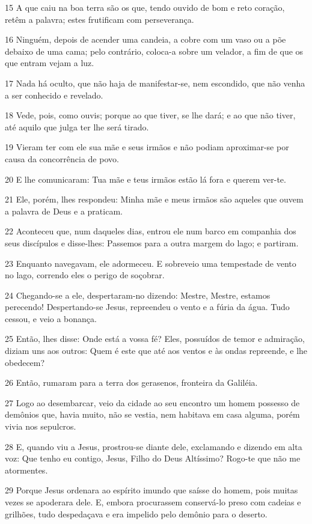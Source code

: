 \par 15 A que caiu na boa terra são os que, tendo ouvido de bom e reto coração, retêm a palavra; estes frutificam com perseverança.
\par 16 Ninguém, depois de acender uma candeia, a cobre com um vaso ou a põe debaixo de uma cama; pelo contrário, coloca-a sobre um velador, a fim de que os que entram vejam a luz.
\par 17 Nada há oculto, que não haja de manifestar-se, nem escondido, que não venha a ser conhecido e revelado.
\par 18 Vede, pois, como ouvis; porque ao que tiver, se lhe dará; e ao que não tiver, até aquilo que julga ter lhe será tirado.
\par 19 Vieram ter com ele sua mãe e seus irmãos e não podiam aproximar-se por causa da concorrência de povo.
\par 20 E lhe comunicaram: Tua mãe e teus irmãos estão lá fora e querem ver-te.
\par 21 Ele, porém, lhes respondeu: Minha mãe e meus irmãos são aqueles que ouvem a palavra de Deus e a praticam.
\par 22 Aconteceu que, num daqueles dias, entrou ele num barco em companhia dos seus discípulos e disse-lhes: Passemos para a outra margem do lago; e partiram.
\par 23 Enquanto navegavam, ele adormeceu. E sobreveio uma tempestade de vento no lago, correndo eles o perigo de soçobrar.
\par 24 Chegando-se a ele, despertaram-no dizendo: Mestre, Mestre, estamos perecendo! Despertando-se Jesus, repreendeu o vento e a fúria da água. Tudo cessou, e veio a bonança.
\par 25 Então, lhes disse: Onde está a vossa fé? Eles, possuídos de temor e admiração, diziam uns aos outros: Quem é este que até aos ventos e às ondas repreende, e lhe obedecem?
\par 26 Então, rumaram para a terra dos gerasenos, fronteira da Galiléia.
\par 27 Logo ao desembarcar, veio da cidade ao seu encontro um homem possesso de demônios que, havia muito, não se vestia, nem habitava em casa alguma, porém vivia nos sepulcros.
\par 28 E, quando viu a Jesus, prostrou-se diante dele, exclamando e dizendo em alta voz: Que tenho eu contigo, Jesus, Filho do Deus Altíssimo? Rogo-te que não me atormentes.
\par 29 Porque Jesus ordenara ao espírito imundo que saísse do homem, pois muitas vezes se apoderara dele. E, embora procurassem conservá-lo preso com cadeias e grilhões, tudo despedaçava e era impelido pelo demônio para o deserto.
